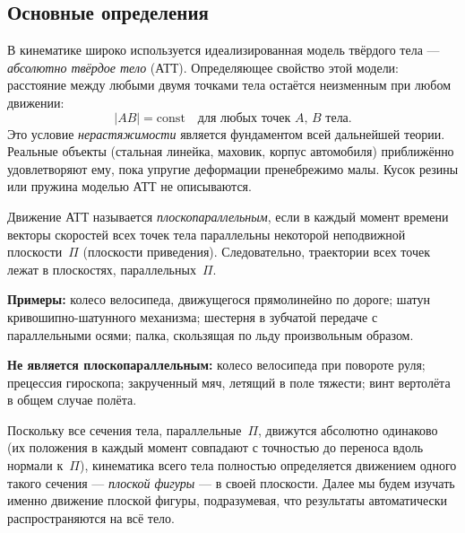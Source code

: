 \documentclass[../main.tex]{subfiles}
\begin{document}
\subsection{Основные определения}

\begin{definition}
В кинематике широко используется идеализированная модель твёрдого тела --- \textit{абсолютно твёрдое тело} (АТТ).
Определяющее свойство этой модели: расстояние между любыми двумя точками тела остаётся неизменным при любом движении:
\[
|AB| = \mathrm{const} \quad \text{для любых точек } A,\, B \text{ тела}.
\]
Это условие \textit{нерастяжимости} является фундаментом всей дальнейшей теории.
Реальные объекты (стальная линейка, маховик, корпус автомобиля) приближённо удовлетворяют ему,
пока упругие деформации пренебрежимо малы. Кусок резины или пружина моделью АТТ не описываются.
\end{definition}

\begin{definition}
Движение АТТ называется \textit{плоскопараллельным}, если в каждый момент времени
векторы скоростей всех точек тела параллельны некоторой неподвижной плоскости~$\Pi$
(плоскости приведения). Следовательно, траектории всех точек лежат в плоскостях,
параллельных~$\Pi$.
\end{definition}

\noindent\textbf{Примеры:} колесо велосипеда, движущегося прямолинейно по дороге; шатун кривошипно-шатунного механизма; шестерня в зубчатой передаче с параллельными осями; палка, скользящая по льду произвольным образом.

\noindent\textbf{Не является плоскопараллельным:} колесо велосипеда при повороте руля; прецессия гироскопа; закрученный мяч, летящий в поле тяжести; винт вертолёта в общем случае полёта.

\begin{definition}
Поскольку все сечения тела, параллельные~$\Pi$, движутся абсолютно одинаково
(их положения в каждый момент совпадают с точностью до переноса вдоль нормали к~$\Pi$),
кинематика всего тела полностью определяется движением одного такого сечения ---
\textit{плоской фигуры} --- в своей плоскости.
Далее мы будем изучать именно движение плоской фигуры, подразумевая, что
результаты автоматически распространяются на всё тело.
\end{definition}
\end{document}
